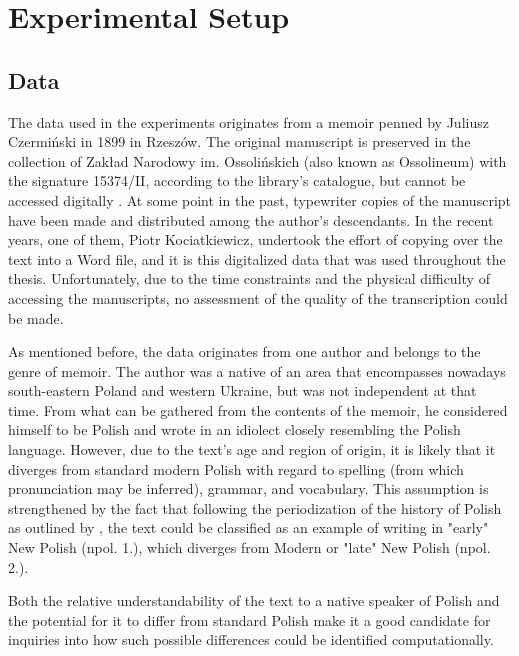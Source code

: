 \section{Experimental Setup}
\label{sec:exp-setup}

\subsection{Data}
\label{subsec:data}

The data used in the experiments originates from a memoir penned by Juliusz Czermiński in 1899 in Rzeszów. The original manuscript is preserved in the collection of Zakład Narodowy im. Ossolińskich (also known as Ossolineum) with the signature 15374/II, according to the library's catalogue, but cannot be accessed digitally \citep{ossolineum}. At some point in the past, typewriter copies of the manuscript have been made and distributed among the author's descendants. In the recent years, one of them, Piotr Kociat\-kiewicz, undertook the effort of copying over the text into a Word file, and it is this digitalized data that was used throughout the thesis. Unfortunately, due to the time constraints and the physical difficulty of accessing the manuscripts, no assessment of the quality of the transcription could be made.

As mentioned before, the data originates from one author and belongs to the genre of memoir. The author was a native of an area that encompasses nowadays south-eastern Poland and western Ukraine, but was not independent at that time. From what can be gathered from the contents of the memoir, he considered himself to be Polish and wrote in an idiolect closely resembling the Polish language. However, due to the text's age and region of origin, it is likely that it diverges from standard modern Polish with regard to spelling (from which pronunciation may be inferred), grammar, and vocabulary. This assumption is strengthened by the fact that following the periodization of the history of Polish as outlined by \citet{długosz-kurczabowa_dubisz_2006}, the text could be classified as an example of writing in "early" New Polish (npol. 1.), which diverges from Modern or "late" New Polish (npol. 2.).

Both the relative understandability of the text to a native speaker of Polish and the potential for it to differ from standard Polish make it a good candidate for inquiries into how such possible differences could be identified computationally.

